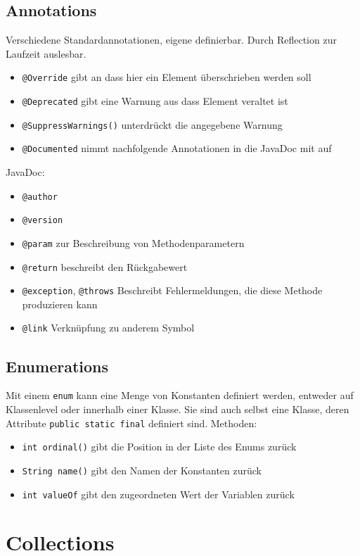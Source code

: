 \documentclass[12pt,a4]{article}
\begin{document}
	
	\subsection{Annotations}
	Verschiedene Standardannotationen, eigene definierbar. Durch Reflection zur Laufzeit auslesbar.
	\begin{itemize}
		\item \texttt{@Override} gibt an dass hier ein Element überschrieben werden soll
		\item \texttt{@Deprecated} gibt eine Warnung aus dass Element veraltet ist
		\item \texttt{@SuppressWarnings()} unterdrückt die angegebene Warnung
		\item \texttt{@Documented} nimmt nachfolgende Annotationen in die JavaDoc mit auf
	\end{itemize}
	JavaDoc:
	\begin{itemize}
		\item \texttt{@author}
		\item \texttt{@version}
		\item \texttt{@param} zur Beschreibung von Methodenparametern
		\item \texttt{@return} beschreibt den Rückgabewert
		\item \texttt{@exception}, \texttt{@throws} Beschreibt Fehlermeldungen, die diese Methode produzieren kann
		\item \texttt{@link} Verknüpfung zu anderem Symbol
	\end{itemize}
	
	\subsection{Enumerations}
	Mit einem \texttt{enum} kann eine Menge von Konstanten definiert werden, entweder auf Klassenlevel oder innerhalb einer Klasse. Sie sind auch selbst eine Klasse, deren Attribute \texttt{public static final} definiert sind. Methoden: 
	\begin{itemize}
		\item \texttt{int ordinal()} gibt die Position in der Liste des Enums zurück
		\item \texttt{String name()} gibt den Namen der Konstanten zurück
		\item \texttt{int valueOf} gibt den zugeordneten Wert der Variablen zurück 
	\end{itemize}
	
	\section{Collections}
\end{document}

